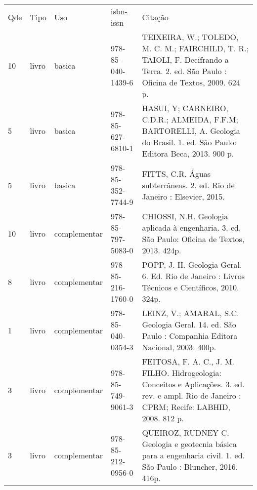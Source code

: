\documentclass[12pt,a4paper,twoside]{report}
\begin{document}
\begin{tabular}{llllp{8cm}}
Qde & Tipo & Uso & isbn-issn & Citação \\
10&livro&basica&978-85-040-1439-6&TEIXEIRA, W.; TOLEDO, M. C. M.; FAIRCHILD, T. R.; TAIOLI, F. Decifrando a Terra. 2. ed. São Paulo : Oficina de Textos, 2009. 624 p.\\
5&livro&basica&978-85-627-6810-1&HASUI, Y; CARNEIRO, C.D.R.; ALMEIDA, F.F.M; BARTORELLI, A. Geologia do Brasil. 1. ed. São Paulo: Editora Beca, 2013. 900 p.\\
5&livro&basica&978-85-352-7744-9&FITTS, C.R. Águas subterrâneas. 2. ed. Rio de Janeiro : Elsevier, 2015.\\
10&livro&complementar&978-85-797-5083-0&CHIOSSI, N.H. Geologia aplicada à engenharia. 3. ed. São Paulo: Oficina de Textos, 2013. 424p.\\
8&livro&complementar&978-85-216-1760-0&POPP, J. H. Geologia Geral. 6. Ed. Rio de Janeiro : Livros Técnicos e Científicos, 2010. 324p.\\
1&livro&complementar&978-85-040-0354-3&LEINZ, V.; AMARAL, S.C. Geologia Geral. 14. ed. São Paulo : Companhia Editora Nacional, 2003. 400p.\\
3&livro&complementar&978-85-749-9061-3&FEITOSA, F. A. C., J. M. FILHO. Hidrogeologia: Conceitos e Aplicações. 3. ed. rev. e ampl. Rio de Janeiro : CPRM; Recife: LABHID, 2008. 812 p.\\
3&livro&complementar&978-85-212-0956-0&QUEIROZ, RUDNEY C. Geologia e geotecnia básica para a engenharia civil. 1. ed. São Paulo : Bluncher, 2016. 416p.\\
\end{tabular}
\end{document}
